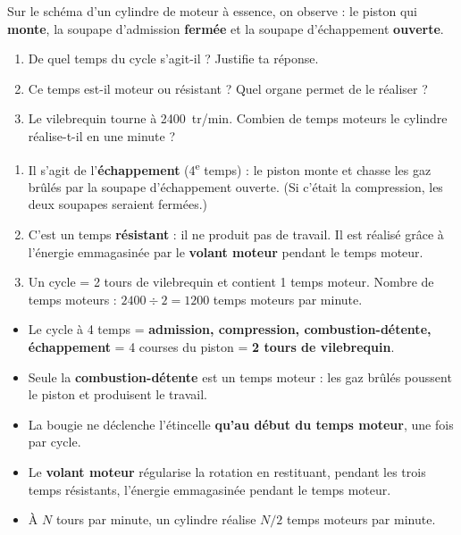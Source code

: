 \documentclass[11pt]{article}
\begin{document}
\begin{exercice}
Sur le schéma d'un cylindre de moteur à essence, on observe : le piston qui \textbf{monte}, la soupape d'admission \textbf{fermée} et la soupape d'échappement \textbf{ouverte}.
\begin{enumerate}
\item De quel temps du cycle s'agit-il ? Justifie ta réponse.
\item Ce temps est-il moteur ou résistant ? Quel organe permet de le réaliser ?
\item Le vilebrequin tourne à \SI{2400}{tr/min}. Combien de temps moteurs le cylindre réalise-t-il en une minute ?
\end{enumerate}
\end{exercice}

\begin{corrige}[Exercice 1]
\begin{enumerate}
\item Il s'agit de l'\textbf{échappement} (4\textsuperscript{e} temps) : le piston monte et chasse les gaz brûlés par la soupape d'échappement ouverte. (Si c'était la compression, les deux soupapes seraient fermées.)
\item C'est un temps \textbf{résistant} : il ne produit pas de travail. Il est réalisé grâce à l'énergie emmagasinée par le \textbf{volant moteur} pendant le temps moteur.
\item Un cycle = 2 tours de vilebrequin et contient 1 temps moteur. Nombre de temps moteurs : $2400 \div 2 = 1200$ temps moteurs par minute.
\end{enumerate}
\end{corrige}

\begin{aretenir}
\begin{itemize}
\item Le cycle à 4 temps = \textbf{admission, compression, combustion-détente, échappement} = 4 courses du piston = \textbf{2 tours de vilebrequin}.
\item Seule la \textbf{combustion-détente} est un temps moteur : les gaz brûlés poussent le piston et produisent le travail.
\item La bougie ne déclenche l'étincelle \textbf{qu'au début du temps moteur}, une fois par cycle.
\item Le \textbf{volant moteur} régularise la rotation en restituant, pendant les trois temps résistants, l'énergie emmagasinée pendant le temps moteur.
\item À $N$ tours par minute, un cylindre réalise $N/2$ temps moteurs par minute.
\end{itemize}
\end{aretenir}
\end{document}
